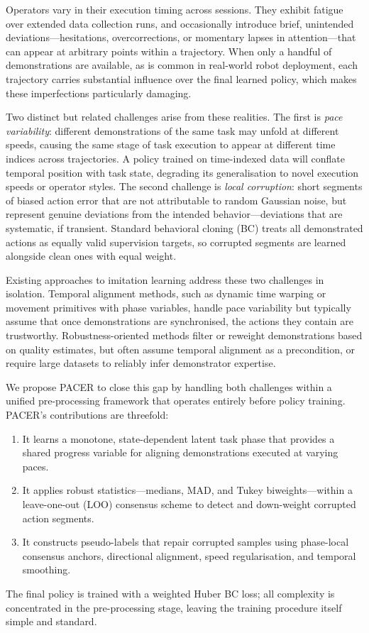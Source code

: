 \documentclass[a4paper, 10pt, conference]{ieeeconf}
\begin{document}
Operators vary in their execution timing across sessions.
They exhibit fatigue over extended data collection runs, and occasionally introduce brief, unintended deviations---hesitations, overcorrections, or momentary lapses in attention---that can appear at arbitrary points within a trajectory.
When only a handful of demonstrations are available, as is common in real-world robot deployment, each trajectory carries substantial influence over the final learned policy, which makes these imperfections particularly damaging.

Two distinct but related challenges arise from these realities.
The first is \emph{pace variability}: different demonstrations of the same task may unfold at different speeds, causing the same stage of task execution to appear at different time indices across trajectories.
A policy trained on time-indexed data will conflate temporal position with task state, degrading its generalisation to novel execution speeds or operator styles.
The second challenge is \emph{local corruption}: short segments of biased action error that are not attributable to random Gaussian noise, but represent genuine deviations from the intended behavior---deviations that are systematic, if transient.
Standard behavioral cloning (BC) treats all demonstrated actions as equally valid supervision targets, so corrupted segments are learned alongside clean ones with equal weight.

Existing approaches to imitation learning address these two challenges in isolation.
Temporal alignment methods, such as dynamic time warping or movement primitives with phase variables, handle pace variability but typically assume that once demonstrations are synchronised, the actions they contain are trustworthy.
Robustness-oriented methods filter or reweight demonstrations based on quality estimates, but often assume temporal alignment as a precondition, or require large datasets to reliably infer demonstrator expertise.

We propose PACER to close this gap by handling both challenges within a unified pre-processing framework that operates entirely before policy training.
PACER's contributions are threefold:
\begin{enumerate}
    \item It learns a monotone, state-dependent latent task phase that provides a shared progress variable for aligning demonstrations executed at varying paces.
    \item It applies robust statistics---medians, MAD, and Tukey biweights---within a leave-one-out (LOO) consensus scheme to detect and down-weight corrupted action segments.
    \item It constructs pseudo-labels that repair corrupted samples using phase-local consensus anchors, directional alignment, speed regularisation, and temporal smoothing.
\end{enumerate}
The final policy is trained with a weighted Huber BC loss; all complexity is concentrated in the pre-processing stage, leaving the training procedure itself simple and standard.
\end{document}
